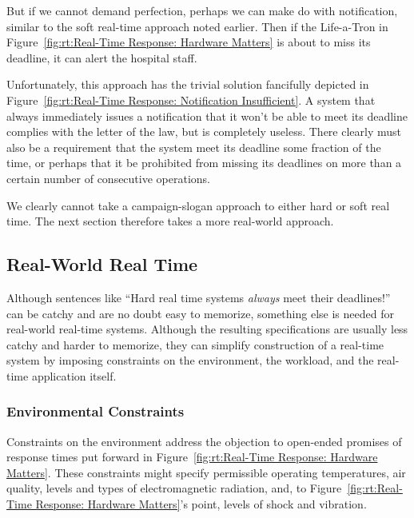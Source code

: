 But if we cannot demand perfection, perhaps we can make do with
notification, similar to the soft real-time approach noted earlier.
Then if the Life-a-Tron in
Figure~\ref{fig:rt:Real-Time Response: Hardware Matters}
is about to miss its deadline,
it can alert the hospital staff.

\begin{figure*}[bt]
\begin{center}
\end{center}
\caption{Real-Time Response: Notification Insufficient}
\label{fig:rt:Real-Time Response: Notification Insufficient}
\end{figure*}

Unfortunately, this approach has the trivial solution fancifully depicted in
Figure~\ref{fig:rt:Real-Time Response: Notification Insufficient}.
A system that always immediately issues a notification that it won't
be able to meet its deadline complies with the letter of the law,
but is completely useless.
There clearly must also be a requirement that the system meet its deadline
some fraction of the time, or perhaps that it be prohibited from missing
its deadlines on more than a certain number of consecutive operations.

We clearly cannot take a campaign-slogan approach to either hard or soft
real time.
The next section therefore takes a more real-world approach.

\subsection{Real-World Real Time}
\label{sec:rt:Real-World Real Time}

Although sentences like ``Hard real time systems \emph{always} meet
their deadlines!'' can be catchy and are no doubt easy to memorize,
something else is needed for real-world real-time systems.
Although the resulting specifications are usually less catchy and
harder to memorize, they can simplify construction of a real-time
system by imposing constraints on the environment, the workload, and
the real-time application itself.

\subsubsection{Environmental Constraints}
\label{sec:rt:Environmental Constraints}

Constraints on the environment address the objection to open-ended
promises of response times put forward in
Figure~\ref{fig:rt:Real-Time Response: Hardware Matters}.
These constraints might specify permissible operating temperatures,
air quality, levels and types of electromagnetic radiation, and, to
Figure~\ref{fig:rt:Real-Time Response: Hardware Matters}'s
point, levels of shock and vibration.

